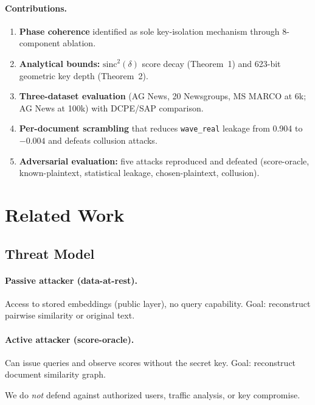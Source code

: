 \documentclass{article}
\begin{document}
\paragraph{Contributions.}
\begin{enumerate}[nosep]
  \item \textbf{Phase coherence} identified as sole key-isolation mechanism through 8-component ablation.
  \item \textbf{Analytical bounds:} $\mathrm{sinc}^2(\delta)$ score decay (Theorem~1) and 623-bit geometric key depth (Theorem~2).
  \item \textbf{Three-dataset evaluation} (AG News, 20 Newsgroups, MS MARCO at 6k; AG News at 100k) with DCPE/SAP comparison.
  \item \textbf{Per-document scrambling} that reduces \texttt{wave\_real} leakage from 0.904 to $-0.004$ and defeats collusion attacks.
  \item \textbf{Adversarial evaluation:} five attacks reproduced and defeated (score-oracle, known-plaintext, statistical leakage, chosen-plaintext, collusion).
\end{enumerate}


\section{Related Work}
\label{sec:related}

\subsection{Threat Model}

\paragraph{Passive attacker (data-at-rest).}
Access to stored embeddings (public layer), no query capability.
Goal: reconstruct pairwise similarity or original text.

\paragraph{Active attacker (score-oracle).}
Can issue queries and observe scores without the secret key.
Goal: reconstruct document similarity graph.

We do \emph{not} defend against authorized users, traffic analysis, or key compromise.
\end{document}
